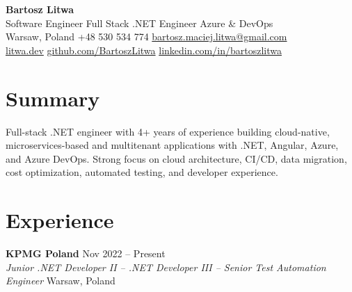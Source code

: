 \documentclass[a4paper,10pt]{article}
\newcommand{\resumeSubheading}[4]{
  \textbf{#1} \hfill #2 \\
  \textit{#3} \hfill #4 \\
}
\begin{document}
\begin{center}
  {\LARGE\textbf{Bartosz Litwa}} \\
  \vspace{3pt}
  Software Engineer \textbar{} Full Stack .NET Engineer \textbar{} Azure \& DevOps \\
  \vspace{3pt}
  Warsaw, Poland \textbar{} +48 530 534 774 \textbar{}
  \href{mailto:bartosz.maciej.litwa@gmail.com}{bartosz.maciej.litwa@gmail.com} \\
  \href{https://litwa.dev}{litwa.dev} \textbar{}
  \href{https://github.com/BartoszLitwa}{github.com/BartoszLitwa}
  \textbar{}
  \href{https://www.linkedin.com/in/bartoszlitwa/}{linkedin.com/in/bartoszlitwa}
\end{center}

\vspace{-8pt}

\section*{Summary}

Full-stack .NET engineer with 4+ years of experience building cloud-native,
microservices-based and multitenant applications with .NET, Angular, Azure,
and Azure DevOps. Strong focus on cloud architecture, CI/CD,
data migration, cost optimization, automated testing, and developer
experience.

\vspace{-4pt}

\section*{Experience}

\resumeSubheading
  {KPMG Poland}
  {Nov 2022 -- Present}
  {Junior .NET Developer II -- .NET Developer III -- Senior Test Automation Engineer}
  {Warsaw, Poland}
  \vspace{-10pt}
\end{document}
